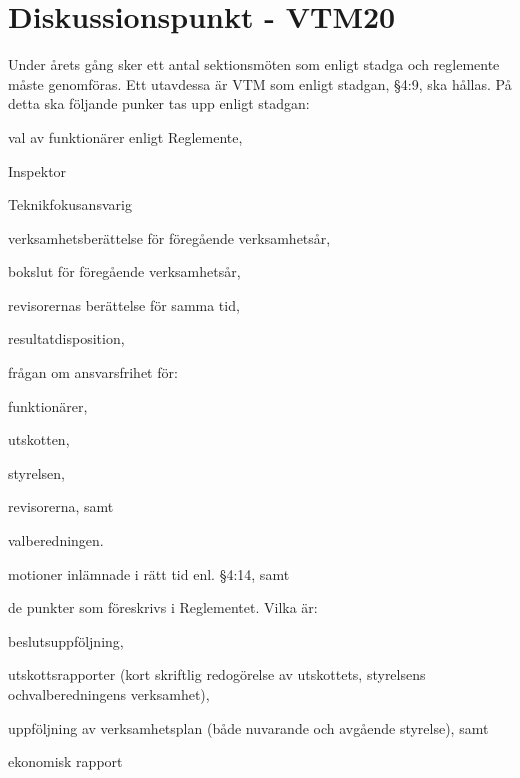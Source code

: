\documentclass[10pt]{article}
\begin{document}
    \section*{Diskussionspunkt - VTM20}
    Under årets gång sker ett antal sektionsmöten som enligt stadga och reglemente måste genomföras. Ett utavdessa är VTM som enligt stadgan, §4:9, ska hållas. På detta ska följande punker tas upp enligt stadgan:
    \begin{alphlist}
    \item 	val av funktionärer enligt Reglemente,
        \begin{numplist}
            \item Inspektor
            \item Teknikfokusansvarig
        \end{numplist}
    \item 	verksamhetsberättelse för föregående verksamhetsår,
    \item 	bokslut för föregående verksamhetsår,
    \item 	revisorernas berättelse för samma tid,
    \item 	resultatdisposition,
    \item 	frågan om ansvarsfrihet för:
        \begin{numplist}
            \item  	funktionärer,
            \item 	utskotten,
            \item 	styrelsen,
            \item 	revisorerna, samt
            \item 	valberedningen.
        \end{numplist}
    \item 	motioner inlämnade i rätt tid enl. §4:14, samt
    \item 	de punkter som föreskrivs i Reglementet. Vilka är:
    \end{alphlist}
    \begin{alphlist}
        \item beslutsuppföljning,
        \item utskottsrapporter (kort skriftlig redogörelse av utskottets, styrelsens ochvalberedningens verksamhet),
        \item uppföljning av verksamhetsplan (både nuvarande och avgående styrelse), samt
        \item ekonomisk rapport \newline
    \end{alphlist}
\end{document}
